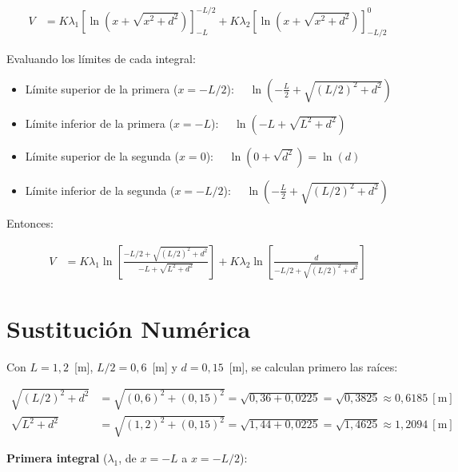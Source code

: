\documentclass[12pt,letterpaper]{article}
\begin{document}
\begin{align*}
    V &= K\lambda_1\left[\ln\!\left(x+\sqrt{x^2+d^2}\right)\right]_{-L}^{-L/2}
       + K\lambda_2\left[\ln\!\left(x+\sqrt{x^2+d^2}\right)\right]_{-L/2}^{0}
\end{align*}

Evaluando los l\'imites de cada integral:

\begin{itemize}
    \item L\'imite superior de la primera ($x=-L/2$):
          $\quad\ln\!\left(-\tfrac{L}{2}+\sqrt{(L/2)^2+d^2}\right)$
    \item L\'imite inferior de la primera ($x=-L$):
          $\quad\ln\!\left(-L+\sqrt{L^2+d^2}\right)$
    \item L\'imite superior de la segunda ($x=0$):
          $\quad\ln\!\left(0+\sqrt{d^2}\right)=\ln(d)$
    \item L\'imite inferior de la segunda ($x=-L/2$):
          $\quad\ln\!\left(-\tfrac{L}{2}+\sqrt{(L/2)^2+d^2}\right)$
\end{itemize}

Entonces:

\begin{align*}
    V &= K\lambda_1\ln\!\left[\frac{-L/2+\sqrt{(L/2)^2+d^2}}{-L+\sqrt{L^2+d^2}}\right]
       + K\lambda_2\ln\!\left[\frac{d}{-L/2+\sqrt{(L/2)^2+d^2}}\right]
\end{align*}

\section*{Sustituci\'on Num\'erica}

Con $L=1{,}2$~[m], $L/2=0{,}6$~[m] y $d=0{,}15$~[m], se calculan primero las ra\'ices:

\begin{align*}
    \sqrt{(L/2)^2+d^2}
        &= \sqrt{(0{,}6)^2+(0{,}15)^2}
         = \sqrt{0{,}36+0{,}0225}
         = \sqrt{0{,}3825}
         \approx 0{,}6185\ [\text{m}]\\[6pt]
    \sqrt{L^2+d^2}
        &= \sqrt{(1{,}2)^2+(0{,}15)^2}
         = \sqrt{1{,}44+0{,}0225}
         = \sqrt{1{,}4625}
         \approx 1{,}2094\ [\text{m}]
\end{align*}

\bigskip
\noindent\textbf{Primera integral} ($\lambda_1$, de $x=-L$ a $x=-L/2$):
\end{document}
